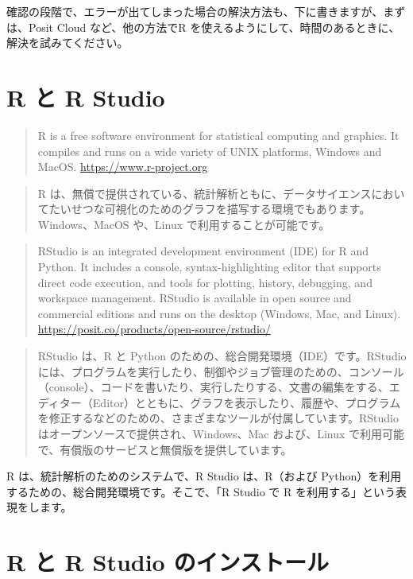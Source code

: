 \documentclass[
  xelatex, ja=standard]{bxjsbook}
\theoremstyle{definition}
\theoremstyle{definition}
\theoremstyle{definition}
\theoremstyle{definition}
\theoremstyle{remark}
\begin{document}
確認の段階で、エラーが出てしまった場合の解決方法も、下に書きますが、まずは、Posit Cloud など、他の方法でR を使えるようにして、時間のあるときに、解決を試みてください。

\hypertarget{r-ux3068-r-studio}{%
\section{R と R Studio}\label{r-ux3068-r-studio}}

\begin{quote}
R is a free software environment for statistical computing and graphics. It compiles and runs on a wide variety of UNIX platforms, Windows and MacOS. \url{https://www.r-project.org}
\end{quote}

\begin{quote}
R は、無償で提供されている、統計解析ともに、データサイエンスにおいてたいせつな可視化のためのグラフを描写する環境でもあります。Windows、MacOS や、Linux で利用することが可能です。
\end{quote}

\begin{quote}
RStudio is an integrated development environment (IDE) for R and Python. It includes a console, syntax-highlighting editor that supports direct code execution, and tools for plotting, history, debugging, and workspace management. RStudio is available in open source and commercial editions and runs on the desktop (Windows, Mac, and Linux).　\url{https://posit.co/products/open-source/rstudio/}
\end{quote}

\begin{quote}
RStudio は、R と Python のための、総合開発環境（IDE）です。RStudio には、プログラムを実行したり、制御やジョブ管理のための、コンソール（console）、コードを書いたり、実行したりする、文書の編集をする、エディター（Editor）とともに、グラフを表示したり、履歴や、プログラムを修正するなどのための、さまざまなツールが付属しています。RStudio はオープンソースで提供され、Windows、Mac および、Linux で利用可能で、有償版のサービスと無償版を提供しています。
\end{quote}

R は、統計解析のためのシステムで、R Studio は、R（および Python）を利用するための、総合開発環境です。そこで、「R Studio で R を利用する」という表現をします。

\hypertarget{r-ux3068-r-studio-ux306eux30a4ux30f3ux30b9ux30c8ux30fcux30eb}{%
\section{R と R Studio のインストール}\label{r-ux3068-r-studio-ux306eux30a4ux30f3ux30b9ux30c8ux30fcux30eb}}
\end{document}
